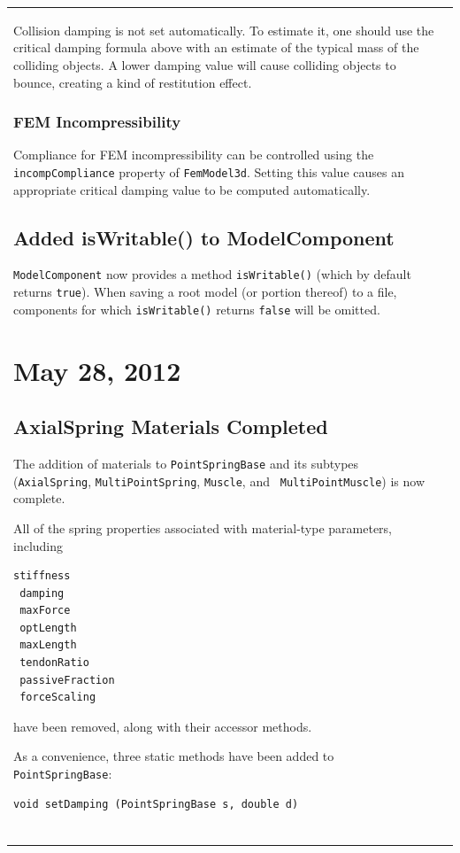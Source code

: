 \documentclass{article}
\begin{document}
\begin{tabular}{ll}
Collision damping is not set automatically. To estimate it, one should
use the critical damping formula above with an estimate of the typical
mass of the colliding objects. A lower damping value will cause colliding
objects to bounce, creating a kind of restitution effect.

\subsubsection*{FEM Incompressibility}

Compliance for FEM incompressibility can be controlled using the {\tt
incompCompliance} property of {\tt FemModel3d}. Setting this value
causes an appropriate critical damping value to be computed
automatically.

\subsection*{Added isWritable() to ModelComponent}

{\tt ModelComponent} now provides a method {\tt isWritable()} (which
by default returns {\tt true}). When saving a root model (or portion
thereof) to a file, components for which {\tt isWritable()} returns
{\tt false} will be omitted.

\section*{May 28, 2012}

\subsection*{AxialSpring Materials Completed}

The addition of materials to {\tt PointSpringBase} and its subtypes
({\tt AxialSpring}, {\tt MultiPointSpring}, {\tt Muscle}, and {\tt
MultiPointMuscle}) is now complete.

All of the spring properties associated with material-type
parameters, including
\begin{lstlisting}[]
 stiffness
 damping
 maxForce
 optLength
 maxLength
 tendonRatio
 passiveFraction
 forceScaling
\end{lstlisting}
have been removed, along with their accessor methods.

As a convenience, three static methods have been added to {\tt
PointSpringBase}:
\begin{lstlisting}[]
 void setDamping (PointSpringBase s, double d)


\end{lstlisting}
\end{tabular}
\end{document}
